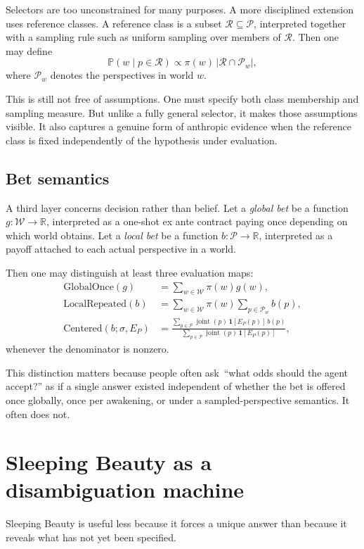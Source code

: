 \documentclass[11pt]{article}
\newcommand{\Pp}{\mathbb{P}}
\newcommand{\1}{\mathbf{1}}
\newcommand{\W}{\mathcal{W}}
\newcommand{\Persp}{\mathcal{P}}
\newcommand{\R}{\mathcal{R}}
\begin{document}
Selectors are too unconstrained for many purposes. A more disciplined extension uses reference classes. A reference class is a subset $\R \subseteq \Persp$, interpreted together with a sampling rule such as uniform sampling over members of $\R$. Then one may define
\[
\Pp(w \mid p \in \R) \propto \pi(w)\,|\R \cap \Persp_w|,
\]
where $\Persp_w$ denotes the perspectives in world $w$.

This is still not free of assumptions. One must specify both class membership and sampling measure. But unlike a fully general selector, it makes those assumptions visible. It also captures a genuine form of anthropic evidence when the reference class is fixed independently of the hypothesis under evaluation.

\subsection{Bet semantics}

A third layer concerns decision rather than belief. Let a \emph{global bet} be a function $g : \W \to \mathbb{R}$, interpreted as a one-shot ex ante contract paying once depending on which world obtains. Let a \emph{local bet} be a function $b : \Persp \to \mathbb{R}$, interpreted as a payoff attached to each actual perspective in a world.

Then one may distinguish at least three evaluation maps:
\begin{align*}
\text{GlobalOnce}(g) &= \sum_{w \in \W} \pi(w) g(w),\\
\text{LocalRepeated}(b) &= \sum_{w \in \W} \pi(w) \sum_{p \in \Persp_w} b(p),\\
\text{Centered}(b;\sigma,E_P) &= \frac{\sum_{p \in \Persp} \operatorname{joint}(p)\,\1[E_P(p)]\,b(p)}{\sum_{p \in \Persp} \operatorname{joint}(p)\,\1[E_P(p)]},
\end{align*}
whenever the denominator is nonzero.

This distinction matters because people often ask \,``what odds should the agent accept?'' as if a single answer existed independent of whether the bet is offered once globally, once per awakening, or under a sampled-perspective semantics. It often does not.

\section{Sleeping Beauty as a disambiguation machine}

Sleeping Beauty is useful less because it forces a unique answer than because it reveals what has not yet been specified.
\end{document}
